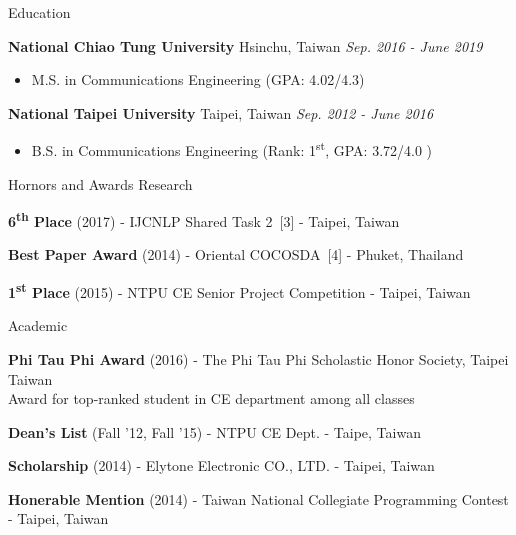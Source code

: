 \documentclass{resume} %
\newcommand{\ts}{\textsuperscript}
\begin{document}

\begin{rSection}{Education}

{\bf National Chiao Tung University} \hfill{Hsinchu, Taiwan} \hfill{\em Sep. 2016 - June 2019}
\begin{itemize} \item {M.S. in Communications Engineering (GPA: 4.02/4.3)} \end{itemize}
{\bf National Taipei University}\hspace*{2em} \hfill{Taipei, Taiwan} \hfill{\em Sep. 2012 - June 2016}
\begin{itemize} \item {B.S. in Communications Engineering (Rank: 1\ts{st}, GPA: 3.72/4.0 )} \end{itemize}
\end{rSection}


\begin{rSection}{Hornors and Awards}
    Research
    \begin{rSubsection}{}{}{}{}
    \item {\bf 6\ts{th} Place} (2017) - IJCNLP Shared Task 2~[3] - Taipei, Taiwan
    \item {\bf Best Paper Award} (2014) - Oriental COCOSDA~[4] - Phuket, Thailand
    \item {\bf 1\ts{st} Place} (2015) - NTPU CE Senior Project Competition - Taipei, Taiwan
    \end{rSubsection}
    Academic
    \begin{rSubsection}{}{}{}{}
    \item {\bf Phi Tau Phi Award} (2016) - The Phi Tau Phi Scholastic Honor Society, Taipei Taiwan \\
    Award for top-ranked student in CE department among all classes
    \item {\bf Dean's List} (Fall '12, Fall '15) - NTPU CE Dept. - Taipe, Taiwan
    \item {\bf Scholarship} (2014) - Elytone Electronic CO., LTD. - Taipei, Taiwan
    \item {\bf Honerable Mention} (2014) - Taiwan National Collegiate Programming Contest - Taipei, Taiwan
    \end{rSubsection}
    \end{rSection}
\end{document}
